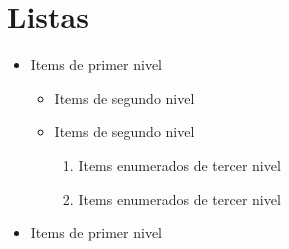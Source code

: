 \documentclass{article}
\begin{document}
\section{Listas}
\begin{itemize}
\item Items de primer nivel
\begin{itemize}
\item Items de segundo nivel 
\item Items de segundo nivel
\begin{enumerate}
\item Items enumerados de tercer nivel
\item Items enumerados de tercer nivel
\end{enumerate}
\end{itemize}
\item Items de primer nivel
\end{itemize}
\end{document}

